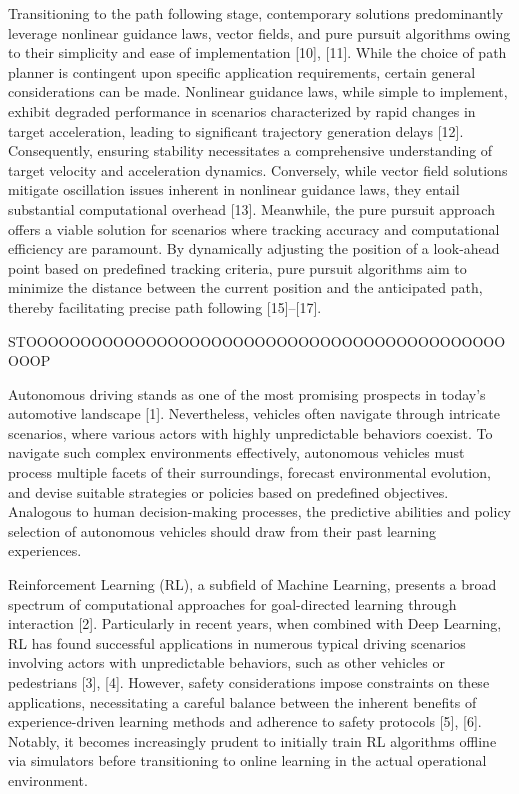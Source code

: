 Transitioning to the path following stage, contemporary solutions predominantly leverage nonlinear guidance laws, vector fields, and pure pursuit algorithms owing to their simplicity and ease of implementation [10], [11]. While the choice of path planner is contingent upon specific application requirements, certain general considerations can be made. Nonlinear guidance laws, while simple to implement, exhibit degraded performance in scenarios characterized by rapid changes in target acceleration, leading to significant trajectory generation delays [12]. Consequently, ensuring stability necessitates a comprehensive understanding of target velocity and acceleration dynamics. Conversely, while vector field solutions mitigate oscillation issues inherent in nonlinear guidance laws, they entail substantial computational overhead [13]. Meanwhile, the pure pursuit approach offers a viable solution for scenarios where tracking accuracy and computational efficiency are paramount. By dynamically adjusting the position of a look-ahead point based on predefined tracking criteria, pure pursuit algorithms aim to minimize the distance between the current position and the anticipated path, thereby facilitating precise path following [15]–[17].

STOOOOOOOOOOOOOOOOOOOOOOOOOOOOOOOOOOOOOOOOOOOOOOOP

Autonomous driving stands as one of the most promising prospects in today's automotive landscape [1]. Nevertheless, vehicles often navigate through intricate scenarios, where various actors with highly unpredictable behaviors coexist. To navigate such complex environments effectively, autonomous vehicles must process multiple facets of their surroundings, forecast environmental evolution, and devise suitable strategies or policies based on predefined objectives. Analogous to human decision-making processes, the predictive abilities and policy selection of autonomous vehicles should draw from their past learning experiences.

Reinforcement Learning (RL), a subfield of Machine Learning, presents a broad spectrum of computational approaches for goal-directed learning through interaction [2]. Particularly in recent years, when combined with Deep Learning, RL has found successful applications in numerous typical driving scenarios involving actors with unpredictable behaviors, such as other vehicles or pedestrians [3], [4]. However, safety considerations impose constraints on these applications, necessitating a careful balance between the inherent benefits of experience-driven learning methods and adherence to safety protocols [5], [6]. Notably, it becomes increasingly prudent to initially train RL algorithms offline via simulators before transitioning to online learning in the actual operational environment.

